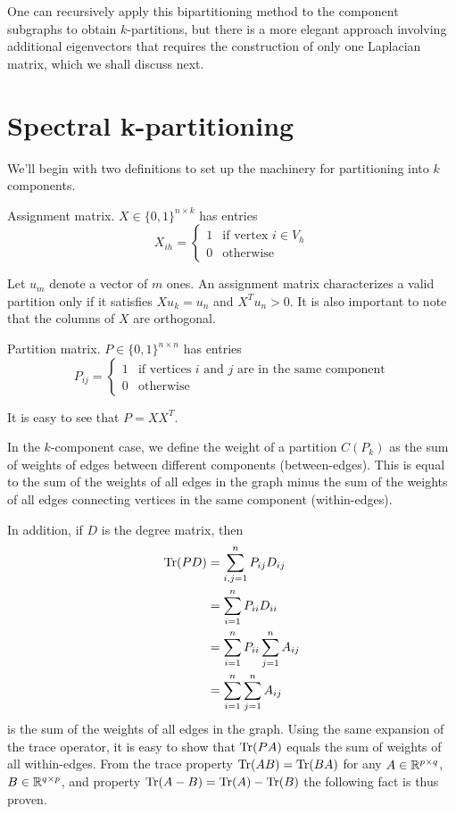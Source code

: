 One can recursively apply this bipartitioning method to the component
subgraphs to obtain $k$-partitions, but there is a more elegant
approach involving additional eigenvectors that requires the
construction of only one Laplacian matrix, which we shall discuss next.

\section{Spectral k-partitioning}

We'll begin with two definitions to set up the machinery for
partitioning into $k$ components.

\begin{definition}
Assignment matrix. $X \in \{0, 1\}^{n \times k}$ has entries
\[ X_{ih} = \begin{cases}
		1 & \mbox{if vertex } i \in V_h \\
		0 & \mbox{otherwise}
\end{cases} \]
\end{definition}

Let $u_m$ denote a vector of $m$ ones.
An assignment matrix characterizes a valid partition only if it
satisfies $X u_k = u_n$ and $X^T u_n > 0$. It is also important
to note that the columns of $X$ are orthogonal.

\begin{definition}
Partition matrix. $P \in \{0, 1\}^{n \times n}$ has entries
\[ P_{ij} = \begin{cases}
		1 & \mbox{if vertices } i \mbox{ and } j
		    \mbox{ are in the same component} \\
		0 & \mbox{otherwise}
\end{cases} \]
\end{definition}

It is easy to see that $P = X X^T$.

In the $k$-component case, we define the weight of a partition
$C(P_k)$ as the sum of weights of edges between different components
(between-edges).
This is equal to the sum of the weights of all edges in the graph minus
the sum of the weights of all edges connecting vertices in the same
component (within-edges).

In addition, if $D$ is the degree matrix, then
\begin{align*}
\operatorname{Tr}(P D) &= \sum_{i,j = 1}^n P_{ij} D_{ij} \\
         &= \sum_{i=1}^n P_{ii} D_{ii}  \\
         &= \sum_{i=1}^n P_{ii} \sum_{j=1}^n A_{ij} \\
         &= \sum_{i=1}^n \sum_{j=1}^n A_{ij}
\end{align*}
is the sum of the weights of all edges in the graph. Using the same
expansion of the trace operator, it is easy to show that $\operatorname{Tr}(P A)$
equals the sum of weights of all within-edges. From the trace
property $\operatorname{Tr}(A B) = \operatorname{Tr}(B A)$ for any $A \in \mathbb{R}^{p \times q}$,
$B \in \mathbb{R}^{q \times p}$, and property
$\operatorname{Tr}(A - B) = \operatorname{Tr}(A) - \operatorname{Tr}(B)$ the following fact is thus
proven.

